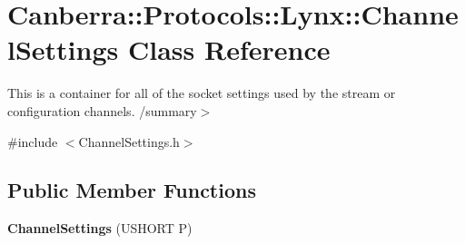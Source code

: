 \hypertarget{class_canberra_1_1_protocols_1_1_lynx_1_1_channel_settings}{}\section{Canberra\+:\+:Protocols\+:\+:Lynx\+:\+:Channel\+Settings Class Reference}
\label{class_canberra_1_1_protocols_1_1_lynx_1_1_channel_settings}


This is a container for all of the socket settings used by the stream or configuration channels. /summary$>$  




{\ttfamily \#include $<$Channel\+Settings.\+h$>$}

\subsection*{Public Member Functions}
\begin{DoxyCompactItemize}
\item 
\mbox{\label{class_canberra_1_1_protocols_1_1_lynx_1_1_channel_settings_a1970e9febb6bc2648c05a21895b8e7ae}} 
{\bfseries Channel\+Settings} (U\+S\+H\+O\+RT P)
\end{DoxyCompactItemize}
